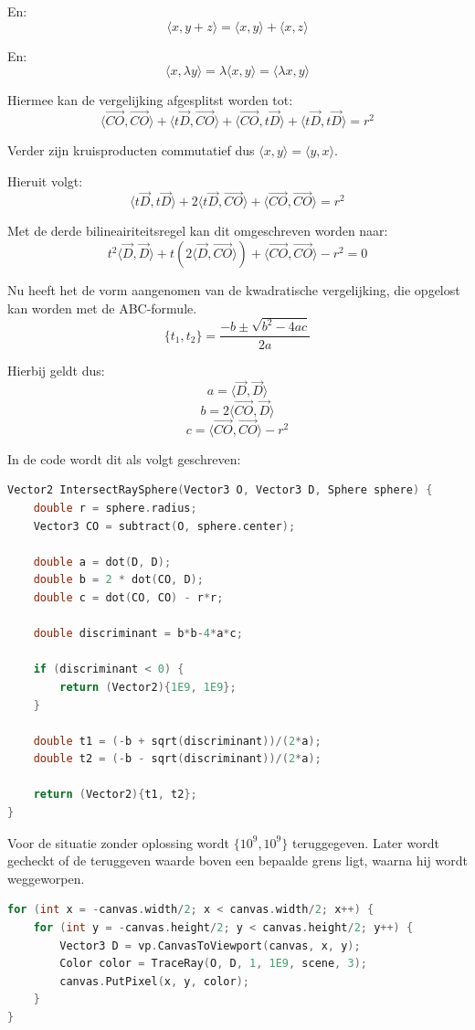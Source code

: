 \documentclass[12pt, a4paper]{article}
\begin{document}
En:
\[\langle x,y+z\rangle=\langle x,y\rangle+\langle x,z\rangle\]

En:
\[\langle x,\lambda y\rangle=\lambda\langle x,y\rangle=\langle\lambda x,y\rangle\]

Hiermee kan de vergelijking afgesplitst worden tot:
\[\langle \vec{CO},\vec{CO} \rangle + \langle t\vec{D},\vec{CO} \rangle + \langle \vec{CO},t\vec{D} \rangle + \langle t\vec{D},t\vec{D} \rangle = r^2\]

Verder zijn kruisproducten commutatief dus $\langle x,y\rangle=\langle y,x\rangle$.

Hieruit volgt:
\[\langle t\vec{D},t\vec{D} \rangle + 2\langle t\vec{D},\vec{CO} \rangle + \langle \vec{CO},\vec{CO} \rangle = r^2\]

Met de derde bilineairiteitsregel kan dit omgeschreven worden naar:
\[t^2\langle \vec{D},\vec{D} \rangle + t\left(2\langle \vec{D},\vec{CO} \rangle
\right) + \langle \vec{CO},\vec{CO} \rangle - r^2 = 0\]

Nu heeft het de vorm aangenomen van de kwadratische vergelijking, die opgelost kan worden met de ABC-formule.
\[\{t_1, t_2\}=\frac{-b\pm \sqrt{b^2-4ac}}{2a}\]

Hierbij geldt dus:
\[a=\langle \vec{D},\vec{D}\rangle\]
\[b=2\langle \vec{CO},\vec{D}\rangle\]
\[c=\langle \vec{CO},\vec{CO}\rangle-r^2\]

In de code wordt dit als volgt geschreven:
\begin{lstlisting}[language=C++]
Vector2 IntersectRaySphere(Vector3 O, Vector3 D, Sphere sphere) {
    double r = sphere.radius;
    Vector3 CO = subtract(O, sphere.center);

    double a = dot(D, D);
    double b = 2 * dot(CO, D);
    double c = dot(CO, CO) - r*r;

    double discriminant = b*b-4*a*c;

    if (discriminant < 0) {
        return (Vector2){1E9, 1E9};
    }

    double t1 = (-b + sqrt(discriminant))/(2*a);
    double t2 = (-b - sqrt(discriminant))/(2*a);

    return (Vector2){t1, t2};
}
\end{lstlisting}

Voor de situatie zonder oplossing wordt $\{10^9,10^9\}$ teruggegeven. Later wordt gecheckt of de teruggeven waarde boven een bepaalde grens ligt, waarna hij wordt weggeworpen.

\begin{lstlisting}[language=C++]
for (int x = -canvas.width/2; x < canvas.width/2; x++) {
    for (int y = -canvas.height/2; y < canvas.height/2; y++) {
        Vector3 D = vp.CanvasToViewport(canvas, x, y);
        Color color = TraceRay(O, D, 1, 1E9, scene, 3);
        canvas.PutPixel(x, y, color);
    }
}
\end{lstlisting}
\end{document}

